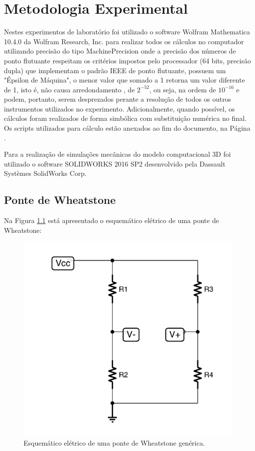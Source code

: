 \documentclass[a4paper]{instrumentacao}
\begin{document}
\chapter{Metodologia Experimental}
Nestes experimentos de laboratório foi utilizado o software Wolfram Mathematica 10.4.0 da Wolfram Research, Inc. para realizar todos os cálculos no computador utilizando precisão do tipo MachinePrecision\cite{mathematica-numerial-precision} onde a precisão dos números de ponto flutuante respeitam os critérios impostos pelo processador (64 bits, precisão dupla) que implementam o padrão IEEE de ponto flutuante, possuem um "Épsilon de Máquina", o menor valor que somado a 1 retorna um valor diferente de 1, isto é, não causa arredondamento \cite{wikipedia-epsilon}, de $2^{-52}$, ou seja, na ordem de $10^{-16}$ e podem, portanto, serem desprezados perante a resolução de todos os outros instrumentos utilizados no experimento. Adicionalmente, quando possível, os cálculos foram realizados de forma simbólica com substituição numérica no final. Os scripts utilizados para cálculo estão anexados ao fim do documento, na Página \pageref{ch:attachments}.

Para a realização de simulações mecânicas do modelo computacional 3D foi utilizado o software SOLIDWORKS 2016 SP2 desenvolvido pela Dassault Systèmes SolidWorks Corp.

\section{Ponte de Wheatstone}

Na Figura \ref{fig:celula-comercial-circuito} está apresentado o esquemático elétrico de uma ponte de Wheatstone:

\begin{figure}[H]
\center
\includegraphics[width=\textwidth]{Wheatstone.pdf}
\caption{Esquemático elétrico de uma ponte de Wheatstone genérica.}
\label{fig:celula-comercial-circuito}
\end{figure}
\end{document}
